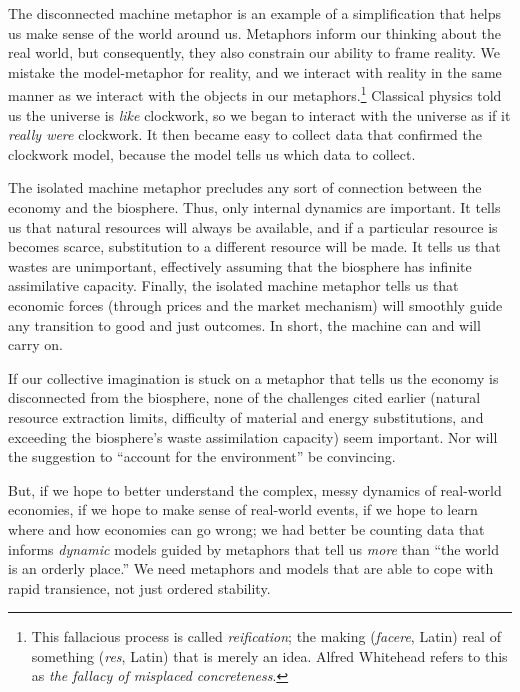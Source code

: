 The disconnected machine metaphor is an example of a simplification 
that helps us make sense of the world around us.
Metaphors inform our thinking about the real world,
but consequently,
they also constrain our ability to frame reality.
We mistake the model-metaphor for reality, and
we interact with reality in the same manner 
as we interact with the objects in our
metaphors.\footnote{This fallacious process is called
	\emph{reification}; the making (\emph{facere}, Latin) real of
	something (\emph{res}, Latin) that is merely an idea.
	Alfred Whitehead refers to this as
	\emph{the fallacy of misplaced concreteness}.\cite{Whitehead2011}}
Classical physics told us the universe is
\emph{like} clockwork, 
so we began to interact with the universe
as if it \emph{really were} clockwork.
It then became easy to collect data that confirmed the clockwork model,
because the model tells us which data to collect.

The isolated machine metaphor precludes any sort of connection 
between the economy and the biosphere.
Thus, only internal dynamics are important. 
It tells us that natural resources will always be available, 
and if a particular resource is becomes scarce, 
substitution to a different resource will be made.
It tells us that wastes are unimportant, effectively assuming that the biosphere
has infinite assimilative capacity.
Finally, the isolated machine metaphor tells us that economic forces 
(through prices and the market mechanism) will smoothly guide any transition
to good and just outcomes.
In short, the machine can and will carry on.

If our collective imagination is stuck on a metaphor that tells us 
the economy is disconnected from the biosphere,
none of the challenges cited earlier (natural resource extraction limits,
difficulty of material and energy substitutions, and 
exceeding the biosphere's waste assimilation capacity)
seem important. 
Nor will the suggestion to ``account for the environment'' be convincing.

But, if we hope to better understand the complex, 
messy dynamics of real-world economies,
if we hope to make sense of real-world events, 
if we hope to learn where and how economies can go wrong;
we had better be counting data that informs \emph{dynamic} models
guided by metaphors that tell us \emph{more} than ``the world is an orderly place.''
We need metaphors and models that are
able to cope with rapid transience,
not just ordered stability.


